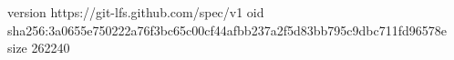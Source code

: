 version https://git-lfs.github.com/spec/v1
oid sha256:3a0655e750222a76f3bc65c00cf44afbb237a2f5d83bb795c9dbc711fd96578e
size 262240
